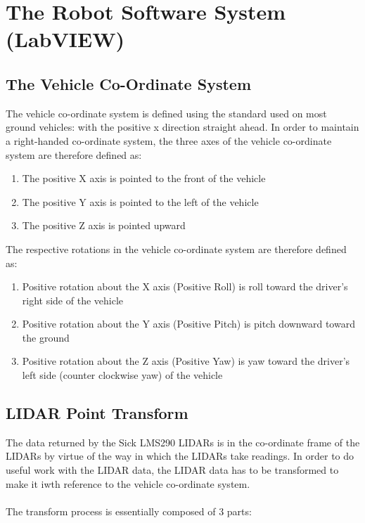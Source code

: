 \section{The Robot Software System (LabVIEW)}

\subsection{The Vehicle Co-Ordinate System}

The vehicle co-ordinate system is defined using the standard used on most ground vehicles: with the positive x direction straight ahead. In order to maintain a right-handed co-ordinate system, the three axes of the vehicle co-ordinate system are therefore defined as:

\begin{enumerate}
\item The positive X axis is pointed to the front of the vehicle
\item The positive Y axis is pointed to the left of the vehicle
\item The positive Z axis is pointed upward
\end{enumerate}

\noindent The respective rotations in the vehicle co-ordinate system are therefore defined as:

\begin{enumerate}
\item Positive rotation about the X axis (Positive Roll) is roll toward the driver's right side of the vehicle
\item Positive rotation about the Y axis (Positive Pitch) is pitch downward toward the ground
\item Positive rotation about the Z axis (Positive Yaw) is yaw toward the driver's left side (counter clockwise yaw) of the vehicle
\end{enumerate}

\subsection{LIDAR Point Transform}

The data returned by the Sick LMS290 LIDARs is in the co-ordinate frame of the LIDARs by virtue of the way in which the LIDARs take readings. In order to do useful work with the LIDAR data, the LIDAR data has to be transformed to make it iwth reference to the vehicle co-ordinate system. \\ \\
%
\noindent The transform process is essentially composed of 3 parts:

